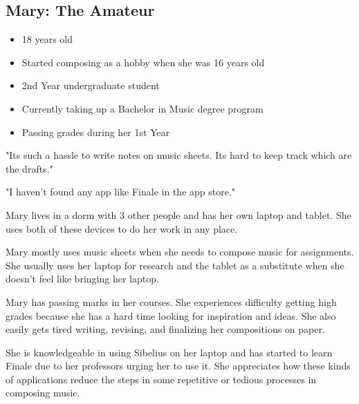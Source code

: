   \begin{comment}
  \begin{wrapfigure}{l}{0.5\textwidth}

    \begin{center}
      \texttt{[image: mary\_persona]}
    \end{center}
  \end{wrapfigure}
  \end{comment}

  \subsection{Mary: The Amateur}

  \begin{itemize}
  \item 18 years old
  \item Started composing as a hobby when she was 16 years old
  \item 2nd Year undergraduate student
  \item Currently taking up a Bachelor in Music degree program
  \item Passing grades during her 1st Year
  \end{itemize}

  "Its such a hassle to write notes on music sheets. Its hard to keep track which are the drafts."

  "I haven't found any app like Finale in the app store."

  Mary lives in a dorm with 3 other people and has her own laptop and tablet. She uses both of these devices to do her work in any place.

  Mary mostly uses music sheets when she needs to compose music for assignments. She usually uses her laptop for research and the tablet as a substitute when she doesn't feel like bringing her laptop.

  Mary has passing marks in her courses. She experiences difficulty getting high grades because she has a hard time looking for inspiration and ideas. She also easily gets tired writing, revising, and finalizing her compositions on paper.

  She is knowledgeable in using Sibelius on her laptop and has started to learn Finale due to her professors urging her to use it. She appreciates how these kinds of applications reduce the steps in some repetitive or tedious processes in composing music.

  \begin{comment}
  \begin{wrapfigure}{l}{0.5\textwidth}
    \begin{center}
    
      \texttt{[image: warren\_persona]}
    \end{center}
  \end{wrapfigure}
  \end{comment}

